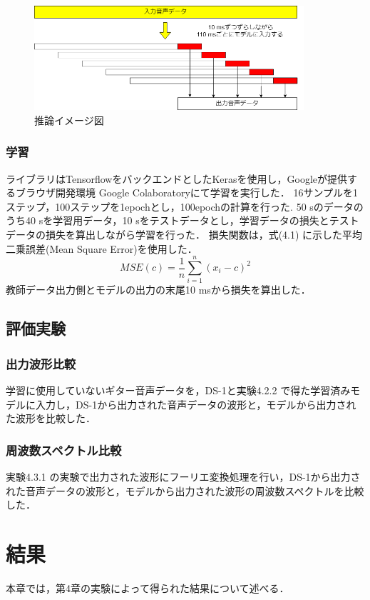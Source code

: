 \documentclass{jreport}		%
\begin{document}
\begin{figure}[htbp]
 \begin{center}
  \includegraphics[width=100mm]{suiron.png}
 \end{center}
 \caption{推論イメージ図}
 \label{fig:one}
\end{figure}

\subsection{学習}
ライブラリはTensorflowをバックエンドとしたKerasを使用し，Googleが提供するブラウザ開発環境 Google Colaboratoryにて学習を実行した．
16サンプルを1ステップ，100ステップを1epochとし，100epochの計算を行った.
50 sのデータのうち40 sを学習用データ，10 sをテストデータとし，学習データの損失とテストデータの損失を算出しながら学習を行った．
損失関数は，式(4.1) に示した平均二乗誤差(Mean Square Error)を使用した．
\begin{equation}
  MSE(c) = \frac{1}{n}\sum_{i=1}^{n}(x_i-c)^2
\end{equation}
教師データ出力側とモデルの出力の末尾10 msから損失を算出した．

\section{評価実験}
\subsection{出力波形比較}
学習に使用していないギター音声データを，DS-1と実験4.2.2 で得た学習済みモデルに入力し，DS-1から出力された音声データの波形と，モデルから出力された波形を比較した．

\subsection{周波数スペクトル比較}
実験4.3.1 の実験で出力された波形にフーリエ変換処理を行い，DS-1から出力された音声データの波形と，モデルから出力された波形の周波数スペクトルを比較した．

\chapter{結果}
本章では，第4章の実験によって得られた結果について述べる．
\end{document}
